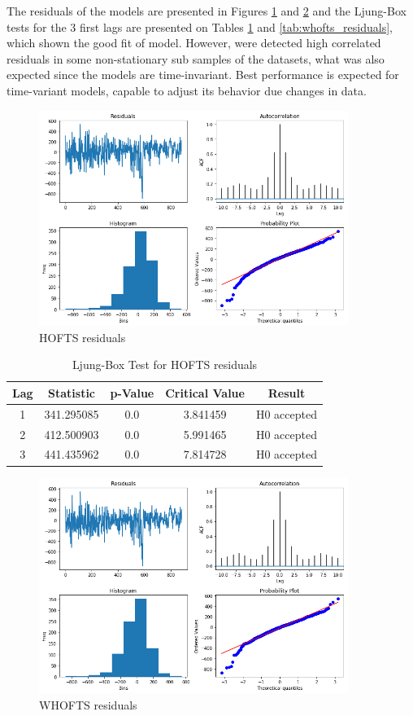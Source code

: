The residuals of the models are presented in Figures \ref{fig:hofts_residual} and \ref{fig:whofts_residual} and the Ljung-Box tests for the 3 first lags are presented on Tables \ref{tab:hofts_residuals} and \ref{tab:whofts_residuals}, which shown the good fit of model. However, were detected high correlated residuals in some non-stationary sub samples of the datasets, what was also expected since the models are time-invariant. Best performance is expected for time-variant models, capable to adjust its behavior due changes in data.

\begin{figure}[htb]
    \centering
    \includegraphics[width=\textwidth,height=7cm]{figures/hofts_residual.png}
    \caption{HOFTS residuals}
    \label{fig:hofts_residual}
\end{figure}

\begin{table}[htb]
    \centering
    \begin{tabular}{|c|c|c|c|c|}
\hline
Lag &   Statistic &  p-Value &  Critical Value &       Result \\ \hline
1 &  341.295085 &      0.0 &        3.841459 &  H0 accepted \\ \hline
2 &  412.500903 &      0.0 &        5.991465 &  H0 accepted \\ \hline
3 &  441.435962 &      0.0 &        7.814728 &  H0 accepted \\ \hline
\end{tabular}
    \caption{Ljung-Box Test for HOFTS residuals}
    \label{tab:hofts_residuals}
\end{table}

\begin{figure}[htb]
    \centering
    \includegraphics[width=\textwidth,height=7cm]{figures/whofts_residual.png}
    \caption{WHOFTS residuals}
    \label{fig:whofts_residual}
\end{figure}

